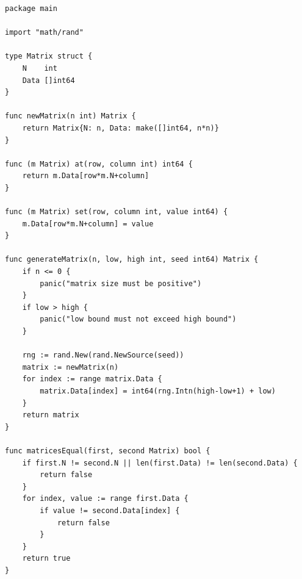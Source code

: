 \documentclass[a4paper,14pt]{extarticle}
\begin{document}
\begin{lstlisting}[caption={Файл 	exttt{matrix.go}}]
package main

import "math/rand"

type Matrix struct {
    N    int
    Data []int64
}

func newMatrix(n int) Matrix {
    return Matrix{N: n, Data: make([]int64, n*n)}
}

func (m Matrix) at(row, column int) int64 {
    return m.Data[row*m.N+column]
}

func (m Matrix) set(row, column int, value int64) {
    m.Data[row*m.N+column] = value
}

func generateMatrix(n, low, high int, seed int64) Matrix {
    if n <= 0 {
        panic("matrix size must be positive")
    }
    if low > high {
        panic("low bound must not exceed high bound")
    }

    rng := rand.New(rand.NewSource(seed))
    matrix := newMatrix(n)
    for index := range matrix.Data {
        matrix.Data[index] = int64(rng.Intn(high-low+1) + low)
    }
    return matrix
}

func matricesEqual(first, second Matrix) bool {
    if first.N != second.N || len(first.Data) != len(second.Data) {
        return false
    }
    for index, value := range first.Data {
        if value != second.Data[index] {
            return false
        }
    }
    return true
}
\end{lstlisting}
\end{document}
